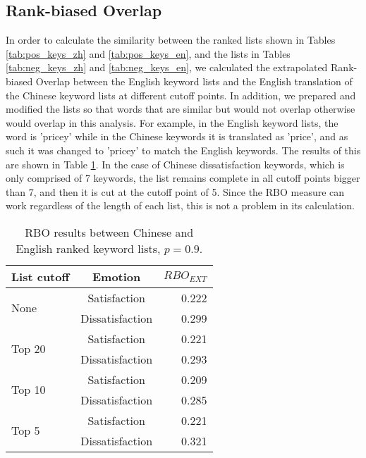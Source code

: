 \documentclass[review]{elsarticle}
\begin{document}
\subsection{Rank-biased Overlap}\label{rboresults}

In order to calculate the similarity between the ranked lists shown in Tables \ref{tab:pos_keys_zh} and \ref{tab:pos_keys_en}, and the lists in Tables \ref{tab:neg_keys_zh} and \ref{tab:neg_keys_en}, we calculated the extrapolated Rank-biased Overlap between the English keyword lists and the English translation of the Chinese keyword lists at different cutoff points. In addition, we prepared and modified the lists so that words that are similar but would not overlap otherwise would overlap in this analysis. For example, in the English keyword lists, the word is 'pricey' while in the Chinese keywords it is translated as 'price', and as such it was changed to 'pricey' to match the English keywords. The results of this are shown in Table \ref{tab:rbo}. In the case of Chinese dissatisfaction keywords, which is only comprised of 7 keywords, the list remains complete in all cutoff points bigger than 7, and then it is cut at the cutoff point of 5. Since the RBO measure can work regardless of the length of each list, this is not a problem in its calculation.

\begin{table}[]
\centering
\caption{RBO results between Chinese and English ranked keyword lists, \(p=0.9\).}
\label{tab:rbo}
\begin{tabular}{|l|c|r|}
\hline
\multicolumn{1}{|c|}{\textbf{List cutoff}} & \textbf{Emotion} & \(RBO_{EXT}\) \\ \hline
\multirow{2}{*}{None} & Satisfaction & 0.222 \\ \cline{2-3} 
 & Dissatisfaction & 0.299 \\ \hline
\multirow{2}{*}{Top 20} & Satisfaction & 0.221 \\ \cline{2-3} 
 & Dissatisfaction & 0.293 \\ \hline
\multirow{2}{*}{Top 10} & Satisfaction & 0.209 \\ \cline{2-3} 
 & Dissatisfaction & 0.285 \\ \hline
\multirow{2}{*}{Top 5} & Satisfaction & 0.221 \\ \cline{2-3} 
 & Dissatisfaction & 0.321 \\ \hline
\end{tabular}
\end{table}
\end{document}

